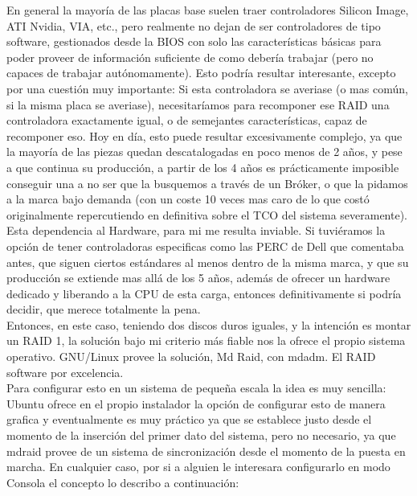 En general la mayoría de las placas base suelen traer controladores Silicon Image, ATI Nvidia, VIA, etc., pero realmente no dejan de ser controladores de tipo software, gestionados desde la BIOS con solo las características básicas para poder proveer de información suficiente de como debería trabajar (pero no capaces de trabajar autónomamente). Esto podría resultar interesante, excepto por una cuestión muy importante: Si esta controladora se averiase (o mas común, si la misma placa se averiase), necesitaríamos para recomponer ese RAID una controladora exactamente igual, o de semejantes características, capaz de recomponer eso. Hoy en día, esto puede resultar excesivamente complejo, ya que la mayoría de las piezas quedan descatalogadas en poco menos de 2 años, y pese a que continua su producción, a partir de los 4 años es prácticamente imposible conseguir una a no ser que la busquemos a través de un Bróker, o que la pidamos a la marca bajo demanda (con un coste 10 veces mas caro de lo que costó originalmente repercutiendo en definitiva sobre el TCO del sistema severamente). Esta dependencia al Hardware, para mi me resulta inviable. Si tuviéramos la opción de tener controladoras especificas como las PERC de Dell que comentaba antes, que siguen ciertos estándares al menos dentro de la misma marca, y que su producción se extiende mas allá de los 5 años, además de ofrecer un hardware dedicado y liberando a la CPU de esta carga, entonces definitivamente si podría decidir, que merece totalmente la pena.\\

Entonces, en este caso, teniendo dos discos duros iguales, y la intención es montar un RAID 1, la solución bajo mi criterio más fiable nos la ofrece el propio sistema operativo. GNU/Linux provee la solución, Md Raid, con mdadm. El RAID software por excelencia.\\

Para configurar esto en un sistema de pequeña escala la idea es muy sencilla:\\

Ubuntu ofrece en el propio instalador la opción de configurar esto de manera grafica y eventualmente es muy práctico ya que se establece justo desde el momento de la inserción del primer dato del sistema, pero no necesario, ya que mdraid provee de un sistema de sincronización desde el momento de la puesta en marcha. En cualquier caso, por si a alguien le interesara configurarlo en modo Consola el concepto lo describo a continuación:\\


